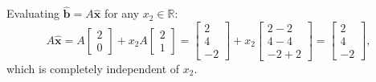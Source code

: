 \documentclass[11pt, letterpaper]{article}
\theoremstyle{definition}
\theoremstyle{remark}
\begin{document}
Evaluating $\hat{\mathbf{b}} = A\hat{\mathbf{x}}$ for any $x_2 \in \mathbb{R}$:
\[
A\hat{\mathbf{x}} = A\begin{bmatrix} 2 \\ 0 \end{bmatrix} + x_2 A\begin{bmatrix} 2 \\ 1 \end{bmatrix} = \begin{bmatrix} 2 \\ 4 \\ -2 \end{bmatrix} + x_2 \begin{bmatrix} 2-2 \\ 4-4 \\ -2+2 \end{bmatrix} = \begin{bmatrix} 2 \\ 4 \\ -2 \end{bmatrix},
\]
which is completely independent of $x_2$.
\end{document}
